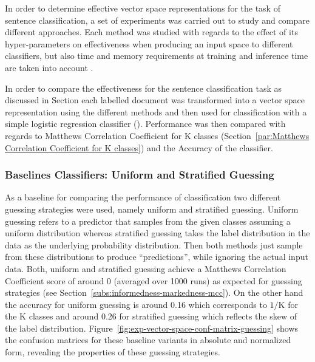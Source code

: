 In order to determine effective vector space representations for the task of sentence classification, a set of experiments was carried out to study and compare different approaches. Each method was studied with regards to the effect of its hyper-parameters on effectiveness when producing an input space to different classifiers, but also time and memory requirements at training and inference time are taken into account .

In order to compare the effectiveness for the sentence classification task as discussed in Section each labelled document was transformed into a vector space representation using the different methods and then used for classification with a simple logistic regression classifier (). Performance was then compared with regards to Matthews Correlation Coefficient for K classes (Section~\ref{par:Matthews Correlation Coefficient for K classes}) and the Accuracy  of the classifier.

\subsubsection{Baselines Classifiers: Uniform and Stratified Guessing}
\label{subs:baselines-classifiers}

As a baseline for comparing the performance of classification two different guessing strategies were used, namely uniform and stratified guessing.
Uniform guessing refers to a predictor that samples from the given classes assuming a uniform distribution whereas stratified guessing takes the label distribution in the data as the underlying probability distribution.
Then both methods just sample from these distributions to produce ``predictions'', while ignoring the actual input data. Both, uniform and stratified guessing achieve a Matthews Correlation Coefficient score of around 0 (averaged over 1000 runs) as expected for guessing strategies (see Section~\ref{subs:informedness-markedness-mcc}). On the other hand the accuracy for uniform guessing is around 0.16 which corresponds to $1/\text{K}$ for the K classes and around 0.26 for stratified guessing which reflects the skew of the label distribution.
Figure~\ref{fig:exp-vector-space-conf-matrix-guessing} shows the confusion matrices for these baseline variants in absolute and normalized form, revealing the properties of these guessing strategies.

